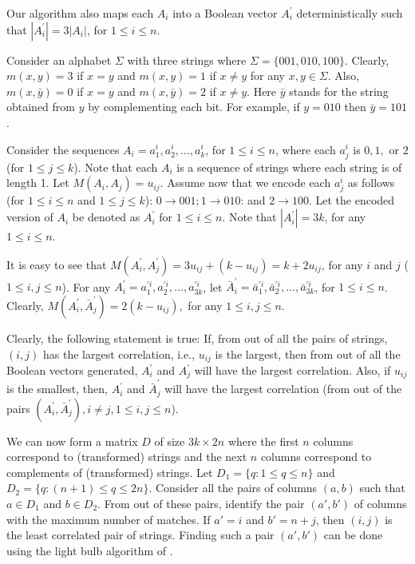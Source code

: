 \documentclass{article}
\theoremstyle{definition}
\theoremstyle{remark}
\begin{document}
 Our algorithm also maps each $A_i$ into a Boolean vector $A_i^\prime$ deterministically such that $|A_i^\prime|=3|A_i|$, for $1\leq i\leq n$.

 Consider an alphabet $\Sigma$ with three strings where $\Sigma=\{001,010, 100\}$. Clearly, $m(x,y)=3$ if $x=y$ and $m(x,y)=1$ if $x\neq y$ for any $x,y\in\Sigma$. Also, $m(x,\bar{y})=0$ if $x=y$ and $m(x,\bar{y})=2$ if $x\neq y$. Here $\bar{y}$ stands for the string obtained from $y$ by complementing each bit. For example, if $y=010$ then $\bar{y}=101$.

 Consider the sequences $A_i=a_1^i,a_2^i,\ldots,a_k^i$, for $1\leq i\leq n$, where each $a_j^i$ is $0,1,$ or $2$ (for $1\leq j\leq k$). Note that each $A_i$ is a sequence of strings where each string is of length 1. Let $M(A_i,A_j)=u_{ij}$. Assume now that we encode each $a_j^i$ as follows (for $1\leq i\leq n$ and $1\leq j\leq k$): $0\rightarrow 001; 1\rightarrow 010$: and $2\rightarrow 100$. Let the encoded version of $A_i$ be denoted as $A_i^\prime$ for $1\leq i\leq n$. Note that $|A_i^\prime|=3k$, for any $1\leq i\leq n$.

 It is easy to see that $M(A_i^\prime,A_j^\prime)=3u_{ij}+(k-u_{ij})=k+2u_{ij}$, for any $i$ and $j$ ($1\leq i,j\leq n$). For any $A_i^\prime=a_1^{\prime i},a_2^{\prime i},\ldots, a_{3k}^{\prime i}$, let $\bar{A}_i^\prime=\bar{a}_1^{\prime i},\bar{a}_2^{\prime i},\ldots,\bar{a}_{3k}^{\prime i}$, for $1\leq i\leq n$. Clearly, $M(A_i^\prime,\bar{A}_j^\prime)=2(k-u_{ij}),$ for any $1\leq i,j\leq n$.

Clearly, the following statement is true: If, from out of all the pairs of strings, $(i,j)$ has the largest correlation, i.e., $u_{ij}$ is the largest, then from out of all the Boolean vectors generated, $A_i^\prime$ and $A_j^\prime$ will have the largest correlation. Also, if $u_{ij}$ is the smallest, then, $A_i^\prime$ and $\bar{A}_j^\prime$ will have the largest correlation (from out of the pairs $(A_i^\prime,\bar{A}_j^\prime),i\neq j,1\leq i,j\leq n$).

 We can now form a matrix $D$ of size $3k\times 2n$ where the first $n$ columns correspond to (transformed) strings and the next $n$ columns correspond to complements of (transformed) strings. Let $D_1=\{q:1\leq q\leq n\}$ and $D_2=\{q:(n+1)\leq q\leq 2n\}$.  Consider all the pairs of columns $(a,b)$ such that $a\in D_1$ and $b\in D_2$. From out of these pairs, identify the pair $(a',b')$ of columns with the maximum number of matches.  If $a'=i$ and $b'=n+j$, then $(i,j)$ is the least correlated pair of strings. Finding such a pair $(a',b')$ can be done using the light bulb algorithm of \cite{RSJ89}.
\end{document}
